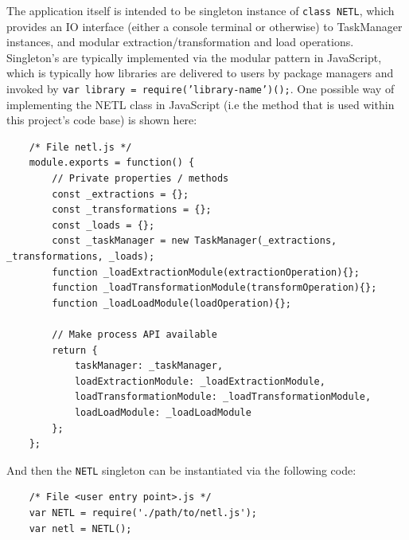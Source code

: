 The application itself is intended to be singleton instance of \texttt{class NETL{}}, which provides an IO interface (either a console terminal or otherwise) to TaskManager instances, and modular extraction/transformation and load operations. Singleton's are typically implemented via the modular pattern in JavaScript, which is typically how libraries are delivered to users by package managers and invoked by \texttt{var library = require('library-name')();}. One possible way of implementing the NETL class in JavaScript (i.e the method that is used within this project's code base) is shown here:

\begin{verbatim}
    /* File netl.js */
    module.exports = function() {
        // Private properties / methods
        const _extractions = {};
        const _transformations = {};
        const _loads = {};        
        const _taskManager = new TaskManager(_extractions, _transformations, _loads);
        function _loadExtractionModule(extractionOperation){};
        function _loadTransformationModule(transformOperation){};
        function _loadLoadModule(loadOperation){};

        // Make process API available
        return {
            taskManager: _taskManager,
            loadExtractionModule: _loadExtractionModule,
            loadTransformationModule: _loadTransformationModule,
            loadLoadModule: _loadLoadModule
        };
    };
\end{verbatim}

And then the \texttt{NETL} singleton can be instantiated via the following code:

\begin{verbatim}
    /* File <user entry point>.js */
    var NETL = require('./path/to/netl.js');
    var netl = NETL();
\end{verbatim}
